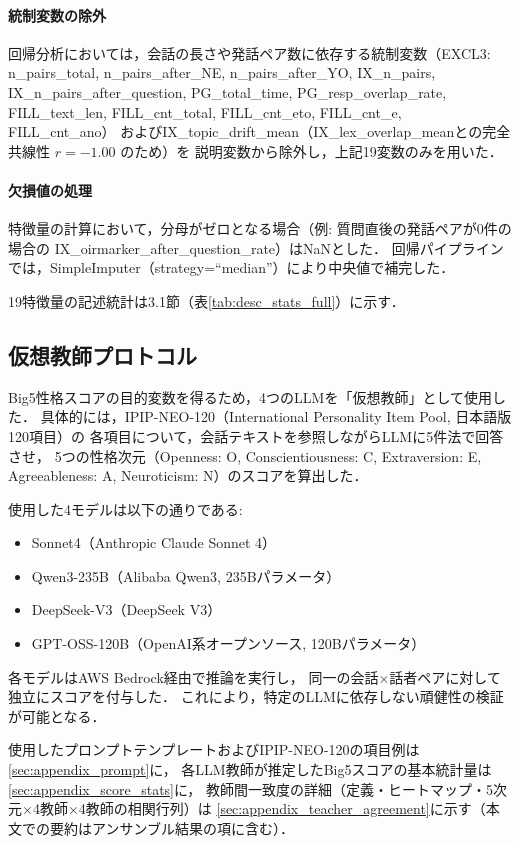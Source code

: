 \documentclass[dvipdfmx,11pt,a4paper]{bxjsarticle}
\begin{document}
\paragraph{統制変数の除外}
回帰分析においては，会話の長さや発話ペア数に依存する統制変数（EXCL3: n\_pairs\_total,
n\_pairs\_after\_NE, n\_pairs\_after\_YO, IX\_n\_pairs, IX\_n\_pairs\_after\_question,
PG\_total\_time, PG\_resp\_overlap\_rate,
FILL\_text\_len, FILL\_cnt\_total, FILL\_cnt\_eto, FILL\_cnt\_e, FILL\_cnt\_ano）
およびIX\_topic\_drift\_mean（IX\_lex\_overlap\_meanとの完全共線性 $r = -1.00$ のため）を
説明変数から除外し，上記19変数のみを用いた．

\paragraph{欠損値の処理}
特徴量の計算において，分母がゼロとなる場合（例: 質問直後の発話ペアが0件の場合の
IX\_oirmarker\_after\_question\_rate）はNaNとした．
回帰パイプラインでは，SimpleImputer（strategy=``median''）により中央値で補完した．

19特徴量の記述統計は3.1節（表\ref{tab:desc_stats_full}）に示す．

\subsection{仮想教師プロトコル}
\label{sec:virtual_teacher}

Big5性格スコアの目的変数を得るため，4つのLLMを「仮想教師」として使用した．
具体的には，IPIP-NEO-120（International Personality Item Pool, 日本語版120項目）の
各項目について，会話テキストを参照しながらLLMに5件法で回答させ，
5つの性格次元（Openness: O, Conscientiousness: C, Extraversion: E,
Agreeableness: A, Neuroticism: N）のスコアを算出した．

使用した4モデルは以下の通りである:
\begin{itemize}
  \item Sonnet4（Anthropic Claude Sonnet 4）
  \item Qwen3-235B（Alibaba Qwen3, 235Bパラメータ）
  \item DeepSeek-V3（DeepSeek V3）
  \item GPT-OSS-120B（OpenAI系オープンソース, 120Bパラメータ）
\end{itemize}

各モデルはAWS Bedrock経由で推論を実行し，
同一の会話$\times$話者ペアに対して独立にスコアを付与した．
これにより，特定のLLMに依存しない頑健性の検証が可能となる．

使用したプロンプトテンプレートおよびIPIP-NEO-120の項目例は
\ref{sec:appendix_prompt}に，
各LLM教師が推定したBig5スコアの基本統計量は
\ref{sec:appendix_score_stats}に，
教師間一致度の詳細（定義・ヒートマップ・5次元$\times$4教師$\times$4教師の相関行列）は
\ref{sec:appendix_teacher_agreement}に示す（本文での要約はアンサンブル結果の項に含む）．
\end{document}
